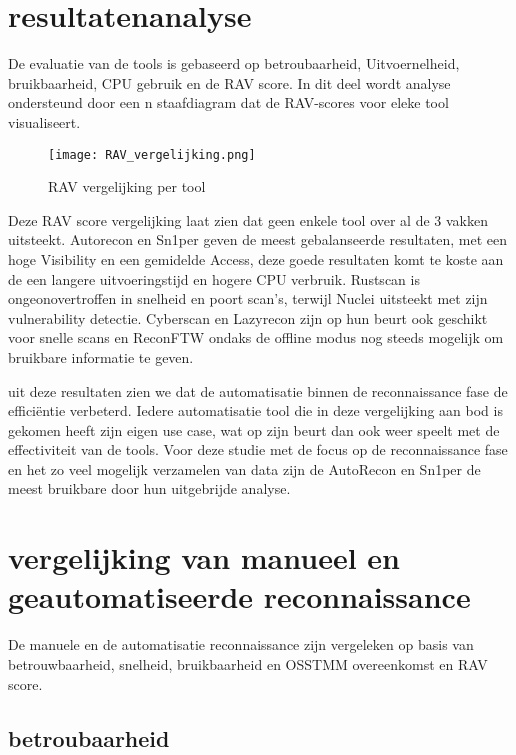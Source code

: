 \section{resultatenanalyse}

De evaluatie van de tools is gebaseerd op betroubaarheid, Uitvoernelheid, bruikbaarheid, CPU gebruik en de RAV score. 
In dit deel wordt analyse ondersteund door een n staafdiagram dat de RAV-scores voor eleke tool visualiseert.  

\begin{figure}[H] 
\centering
\texttt{[image: RAV\_vergelijking.png]}
\caption{RAV vergelijking per tool}
\label{fig:rav_barplot}
\end{figure}

Deze RAV score vergelijking laat zien dat geen enkele tool over al de 3 vakken uitsteekt. 
Autorecon en Sn1per geven de meest gebalanseerde resultaten, met een hoge Visibility en een gemidelde Access, deze goede resultaten komt te koste aan de een langere uitvoeringstijd en hogere CPU verbruik.
Rustscan is ongeonovertroffen in snelheid en poort scan's, terwijl Nuclei uitsteekt met zijn vulnerability detectie.
Cyberscan en Lazyrecon zijn op hun beurt ook geschikt voor snelle scans en ReconFTW ondaks de offline modus nog steeds mogelijk om bruikbare informatie te geven. 

uit deze resultaten zien we dat de automatisatie binnen de reconnaissance fase de efficiëntie verbeterd. 
Iedere automatisatie tool die in deze vergelijking aan bod is gekomen heeft zijn eigen use case, wat op zijn beurt dan ook weer speelt met de effectiviteit van de tools.
Voor deze studie met de focus op de reconnaissance fase en het zo veel mogelijk verzamelen van data zijn de AutoRecon en Sn1per de meest bruikbare door hun uitgebrijde analyse.

\section{vergelijking van manueel en geautomatiseerde reconnaissance}
De manuele en de automatisatie reconnaissance zijn vergeleken op basis van betrouwbaarheid, snelheid, bruikbaarheid en OSSTMM overeenkomst en RAV score.
\subsection{betroubaarheid}

